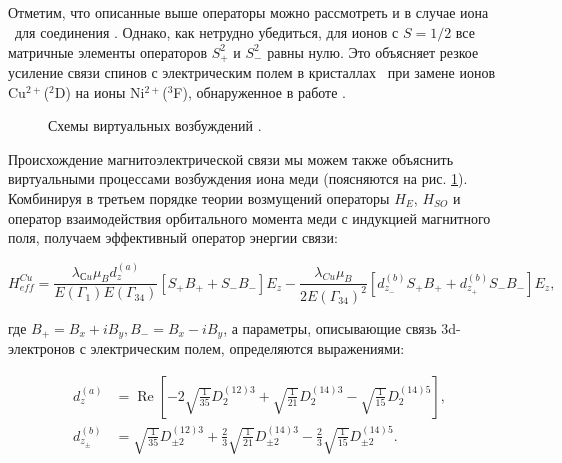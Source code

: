 \subsection{\cud}\label{subsec:ch2/sec3/sub2}

Отметим, что описанные выше операторы можно рассмотреть и в случае иона \cud\ для соединения \cbo. Однако, как нетрудно убедиться, для ионов с $S=1/2$ все матричные элементы операторов $S_{+}^{2}$ и $S_{-}^{2}$ равны нулю. Это объясняет резкое усиление связи спинов с электрическим полем в кристаллах \cbo\ при замене ионов Cu$^{2+}$($^{2}$D) на ионы Ni$^{2+}$($^{3}$F), обнаруженное в работе \cite{Khanh2013}.

\begin{figure}[ht]
	\caption{Схемы виртуальных возбуждений \cud.}
	\label{fig:cu_trans}
\end{figure}

Происхождение магнитоэлектрической связи мы можем также объяснить виртуальными процессами возбуждения иона меди (поясняются на рис. \cref{fig:cu_trans}). Комбинируя в третьем порядке теории возмущений операторы $H_{E}$, $H_{SO}$ и оператор взаимодействия орбитального момента меди с индукцией магнитного поля, получаем эффективный оператор энергии связи:

\begin{equation}
	\label{eq:CuHEff}
	H_{eff}^{Cu}=\frac{\lambda_{Сu} \mu_{B} d_{z}^{(a)}}{E\left(\Gamma_{1}\right) E\left(\Gamma_{34}\right)}\left[S_{+} B_{+}+S_{-} B_{-}\right] E_{z} - \frac{\lambda_{Cu} \mu_{B} }{2 E\left(\Gamma_{34}\right)^{2}}\left[d_{z_{-}}^{(b)}S_{+} B_{+} + d_{z_{+}}^{(b)} S_{-} B_{-}\right] E_{z},
\end{equation}

где $B_{+}=B_{x}+iB_{y}, B_{-}=B_{x}-iB_{y}$, а параметры, описывающие связь 3d-электронов с электрическим полем, определяются выражениями:

\begin{equation}
	\label{eq:CuDz}
	\begin{aligned}
		d_{z}^{(a)}&=\operatorname{Re}\left[-2 \sqrt{\frac{1}{35}} D_{2}^{(12) 3}+\sqrt{\frac{1}{21}} D_{2}^{(14) 3}-\sqrt{\frac{1}{15}} D_{2}^{(14) 5}\right], \\
		d_{z_{\pm}}^{(b)}&=\sqrt{\frac{1}{35}} D_{\pm2}^{(12)3}+\frac{2}{3} \sqrt{\frac{1}{21}} D_{\pm2}^{(14) 3}-\frac{2}{3} \sqrt{\frac{1}{15}} D_{\pm2}^{(14) 5}.
	\end{aligned}
\end{equation}

